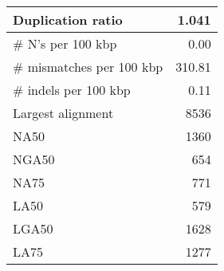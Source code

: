 \documentclass[12pt,a4paper]{article}
\begin{document}
\begin{table}[ht]
\begin{center}
\begin{tabular}{|l*{1}{|r}|}
Duplication ratio & 1.041 \\ \hline
\# N's per 100 kbp & 0.00 \\ \hline
\# mismatches per 100 kbp & 310.81 \\ \hline
\# indels per 100 kbp & 0.11 \\ \hline
Largest alignment & 8536 \\ \hline
NA50 & 1360 \\ \hline
NGA50 & 654 \\ \hline
NA75 & 771 \\ \hline
LA50 & 579 \\ \hline
LGA50 & 1628 \\ \hline
LA75 & 1277 \\ \hline
\end{tabular}
\end{center}
\end{table}
\end{document}
